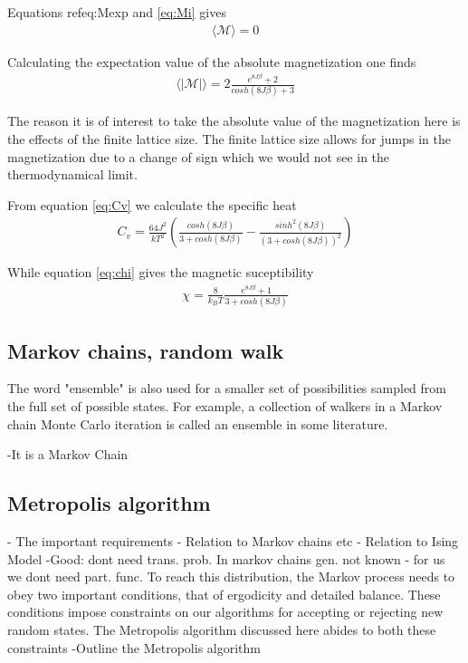 \documentclass[norsk, 10pt, twocolumn, a4paper]{revtex4}
\begin{document}
Equations ref{eq:Mexp} and \ref{eq:Mi} gives
\begin{align*}
    \langle \mathscr{M} \rangle = 0 
\end{align*}

Calculating the expectation value of the absolute magnetization one finds
\begin{align*}
    \langle |\mathscr{M}| \rangle = 2\frac{e^{8J\beta} + 2}{cosh(8J\beta) + 3}
\end{align*}

The reason it is of interest to take the absolute value of the magnetization here is the effects of the finite lattice size.
The finite lattice size allows for jumps in the magnetization due to a change of sign which we would not see in the
thermodynamical limit.

From equation \ref{eq:Cv} we calculate the specific heat
\begin{align}
    C_v = \frac{64J^2}{kT^2}(\frac{cosh(8J\beta)}{3+cosh(8J\beta)} - \frac{sinh^2(8J\beta)}{(3+cosh(8J\beta))^2})
\end{align}

While equation \ref{eq:chi} gives the magnetic suceptibility
\begin{align*}
    \chi = \frac{8}{k_BT}\frac{e^{8J\beta}+1}{3+cosh(8J\beta)}
\end{align*}

\subsection{Markov chains, random walk}
The word "ensemble" is also used for a smaller set of possibilities sampled from the full set of possible states. For example, a collection of walkers in a Markov chain Monte Carlo iteration is called an ensemble in some literature.

-It is a Markov Chain

\subsection{Metropolis algorithm}
- The important requirements
- Relation to Markov chains etc
- Relation to Ising Model
-Good: dont need trans. prob. In markov chains gen. not known - for us we dont
need part. func.
To reach this distribution, the Markov process needs to obey two important conditions, that
of ergodicity and detailed balance. These conditions impose constraints on our algorithms for
accepting or rejecting new random states. The Metropolis algorithm discussed here abides
to both these constraints
-Outline the Metropolis algorithm
\end{document}
